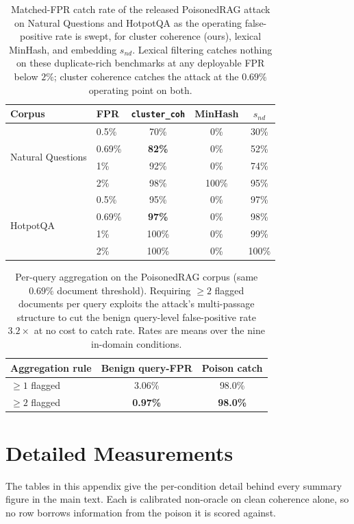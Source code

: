 \documentclass[10pt,journal,compsoc]{IEEEtran}
\begin{document}
\begin{table}[H]
\centering
\caption{Matched-FPR catch rate of the released PoisonedRAG attack on Natural
Questions and HotpotQA as the operating false-positive rate is swept, for cluster
coherence (ours), lexical MinHash, and embedding $s_{nd}$. Lexical filtering catches
nothing on these duplicate-rich benchmarks at any deployable FPR below $2\%$; cluster coherence
catches the attack at the $0.69\%$ operating point on both.}
\label{tab:roc}
\begin{tabular}{llccc}
\toprule
Corpus & FPR & \texttt{cluster\_coh} & MinHash & $s_{nd}$ \\
\midrule
\multirow{4}{*}{Natural Questions}
 & 0.5\%  & 70\% & 0\%   & 30\% \\
 & 0.69\% & \textbf{82\%} & 0\% & 52\% \\
 & 1\%    & 92\% & 0\%   & 74\% \\
 & 2\%    & 98\% & 100\% & 95\% \\
\midrule
\multirow{4}{*}{HotpotQA}
 & 0.5\%  & 95\%  & 0\% & 97\% \\
 & 0.69\% & \textbf{97\%} & 0\% & 98\% \\
 & 1\%    & 100\% & 0\% & 99\% \\
 & 2\%    & 100\% & 0\% & 100\% \\
\bottomrule
\end{tabular}
\end{table}

\begin{table}[H]
\centering
\caption{Per-query aggregation on the PoisonedRAG corpus (same $0.69\%$ document
threshold). Requiring $\geq\!2$ flagged documents per query exploits the attack's
multi-passage structure to cut the benign query-level false-positive rate
$3.2\times$ at no cost to catch rate. Rates are means over the nine in-domain conditions.}
\label{tab:agg}
\begin{tabular}{lcc}
\toprule
Aggregation rule & Benign query-FPR & Poison catch \\
\midrule
$\geq\!1$ flagged & 3.06\% & 98.0\% \\
$\geq\!2$ flagged & \textbf{0.97\%} & \textbf{98.0\%} \\
\bottomrule
\end{tabular}
\end{table}

\section{Detailed Measurements}
\label{app:detail}
The tables in this appendix give the per-condition detail behind every summary figure in the main text. Each is calibrated non-oracle on clean coherence alone, so no row borrows
information from the poison it is scored against.
\end{document}
